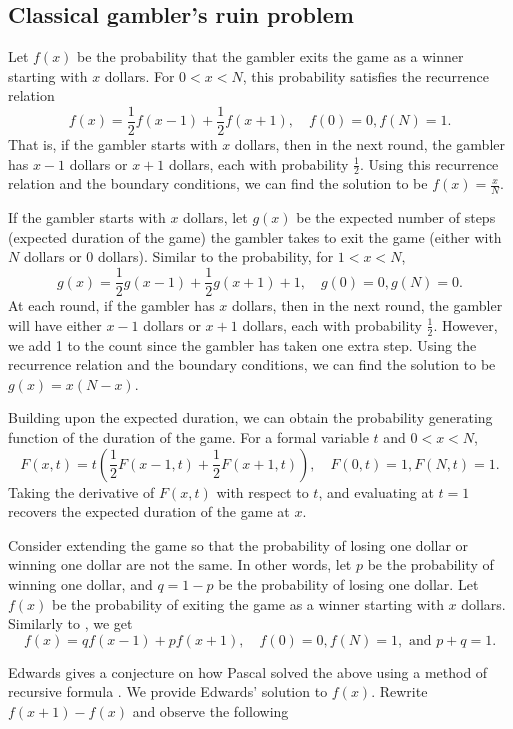 \documentclass[reqno]{amsart}
\theoremstyle{definition}
\theoremstyle{definition}
\theoremstyle{remark}
\begin{document}
\subsection{Classical gambler's ruin problem}\label{subsec:classical}
Let $f(x)$ be the probability that the gambler exits the game as a winner starting with $x$ dollars. For $0<x<N$, this probability satisfies the recurrence relation
\begin{equation} \label{eq:probclass}
    f(x)=\frac{1}{2}f(x-1)+\frac{1}{2}f(x+1), \quad f(0)=0, f(N)=1.
\end{equation}
That is, if the gambler starts with $x$ dollars, then in the next round, the gambler has $x-1$ dollars or $x+1$ dollars, each with probability $\frac{1}{2}$. Using this recurrence relation and the boundary conditions, we can find the solution to be $f(x)=\frac{x}{N}$. 
        
        
If the gambler starts with $x$ dollars, let $g(x)$ be the expected number of steps (expected duration of the game) the gambler takes to exit the game (either with $N$ dollars or $0$ dollars). Similar to the probability, for $1<x<N$, \[g(x)=\frac{1}{2}g(x-1)+\frac{1}{2}g(x+1) +1, \quad g(0)=0, g(N)=0.\] At each round, if the gambler has $x$ dollars, then in the next round, the gambler will have either $x-1$ dollars or $x+1$ dollars, each with probability $\frac{1}{2}$. However, we add 1 to the count since the gambler has taken one extra step. Using the recurrence relation and the boundary conditions, we can find the solution to be $g(x)=x(N-x)$.


Building upon the expected duration, we can obtain the probability generating function of the duration of the game. For a formal variable $t$ and $0<x<N$, \[F(x,t)=t\left(\frac{1}{2}F(x-1,t)+\frac{1}{2}F(x+1,t)\right), \quad F(0,t)=1, F(N,t)=1.\]
Taking the derivative of $F(x,t)$ with respect to $t$, and evaluating at $t=1$ recovers the expected duration of the game at $x$.


Consider extending the game so that the probability of losing one dollar or winning one dollar are not the same. In other words, let $p$ be the probability of winning one dollar, and $q=1-p$ be the probability of losing one dollar. Let $f(x)$ be the probability of exiting the game as a winner starting with $x$ dollars. Similarly to , we get
\[ f(x)=qf(x-1)+pf(x+1), \quad f(0)=0, f(N)=1, \text{ and } p+q=1. \]


Edwards gives a conjecture on how Pascal solved the above using a method of recursive formula \cite{Edwards1983}. We provide Edwards' solution to $f(x)$. Rewrite $f(x+1)-f(x)$ and observe the following
\end{document}
